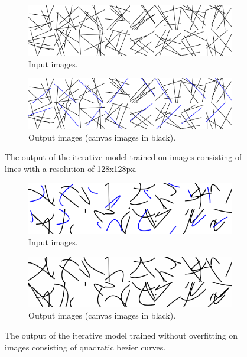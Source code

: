 \begin{figure}
    \centering
    \begin{subfigure}{.45\textwidth}
        \includegraphics[width=\textwidth]{graphics/work-artifacts/iterative/server/145/real_images.png}
        \caption{Input images.}
    \end{subfigure}
    \begin{subfigure}{.45\textwidth}
        \includegraphics[width=\textwidth]{graphics/work-artifacts/iterative/server/145/generated_images.png}
        \caption{Output images (canvas images in black).}
    \end{subfigure}
    \caption{The output of the iterative model trained on images consisting of lines with a resolution of 128x128px.}
    \label{fig:iterative.server.145.recons}
\end{figure}

\begin{figure}
    \centering
    \begin{subfigure}{.45\textwidth}
        \includegraphics[width=\textwidth]{graphics/work-artifacts/iterative/147/input.png}
        \caption{Input images.}
    \end{subfigure}
    \begin{subfigure}{.45\textwidth}
        \includegraphics[width=\textwidth]{graphics/work-artifacts/iterative/147/recons.png}
        \caption{Output images (canvas images in black).}
    \end{subfigure}
    \caption{The output of the iterative model trained without overfitting on images consisting of quadratic bezier curves.}
    \label{fig:iterative.147.recons}
\end{figure}

